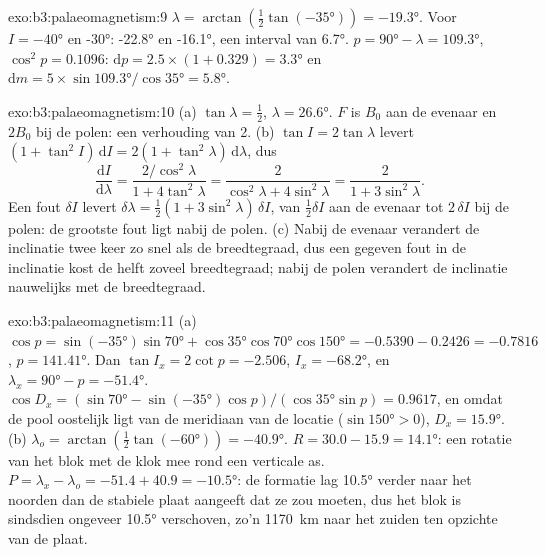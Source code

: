 \begin{solution}{exo:b3:palaeomagnetism:9}
$\lambda = \arctan(\tfrac12\tan(\ang{-35})) = \ang{-19.3}$. Voor $I = \ang{-40}$
en \ang{-30}: \ang{-22.8} en \ang{-16.1}, een interval van \ang{6.7}.
$p = \ang{90} - \lambda = \ang{109.3}$, $\cos^2p = 0.1096$:
$\mathrm dp = 2.5\times(1 + 0.329) = \ang{3.3}$ en $\mathrm dm =
5\times\sin\ang{109.3}/\cos\ang{35} = \ang{5.8}$.
\end{solution}

\begin{solution}{exo:b3:palaeomagnetism:10}
(a) $\tan\lambda = \tfrac12$, $\lambda = \ang{26.6}$. $F$ is $B_0$ aan de
evenaar en $2B_0$ bij de polen: een verhouding van 2. (b) $\tan I = 2\tan\lambda$
levert $(1 + \tan^2I)\,\mathrm dI = 2(1 + \tan^2\lambda)\,\mathrm d\lambda$, dus
\[
  \frac{\mathrm dI}{\mathrm d\lambda} = \frac{2/\cos^2\lambda}{1 + 4\tan^2\lambda}
  = \frac{2}{\cos^2\lambda + 4\sin^2\lambda} = \frac{2}{1 + 3\sin^2\lambda}.
\]
Een fout $\delta I$ levert $\delta\lambda = \tfrac12(1 + 3\sin^2\lambda)\,\delta I$,
van $\tfrac12\delta I$ aan de evenaar tot $2\,\delta I$ bij de polen: de
grootste fout ligt nabij de polen. (c) Nabij de evenaar verandert de inclinatie
twee keer zo snel als de breedtegraad, dus een gegeven fout in de inclinatie kost
de helft zoveel breedtegraad; nabij de polen verandert de inclinatie nauwelijks met de breedtegraad.
\end{solution}

\begin{solution}{exo:b3:palaeomagnetism:11}
(a) $\cos p = \sin(\ang{-35})\sin\ang{70} + \cos\ang{35}\cos\ang{70}\cos\ang{150}
= -0.5390 - 0.2426 = -0.7816$, $p = \ang{141.41}$. Dan $\tan I_x = 2\cot p =
-2.506$, $I_x = \ang{-68.2}$, en $\lambda_x = \ang{90} - p = \ang{-51.4}$.
$\cos D_x = (\sin\ang{70} - \sin(\ang{-35})\cos p)/(\cos\ang{35}\sin p) =
0.9617$, en omdat de pool oostelijk ligt van de meridiaan van de locatie ($\sin\ang{150} >
0$), $D_x = \ang{15.9}$. (b) $\lambda_o = \arctan(\tfrac12\tan(\ang{-60})) =
\ang{-40.9}$. $R = 30.0 - 15.9 = \ang{14.1}$: een rotatie van het blok met de klok mee
rond een verticale as. $P = \lambda_x - \lambda_o = -51.4 + 40.9 =
\ang{-10.5}$: de formatie lag \ang{10.5} verder naar het noorden dan de stabiele
plaat aangeeft dat ze zou moeten, dus het blok is sindsdien ongeveer \ang{10.5} verschoven, zo'n
\qty{1170}{km} naar het zuiden ten opzichte van de plaat.
\end{solution}

